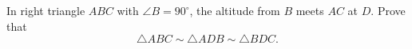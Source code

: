 In right triangle $ABC$ with $\angle B=90^\circ$, the altitude from $B$ meets $AC$ at $D$. Prove that
\[\triangle ABC\sim\triangle ADB\sim\triangle BDC.\]
